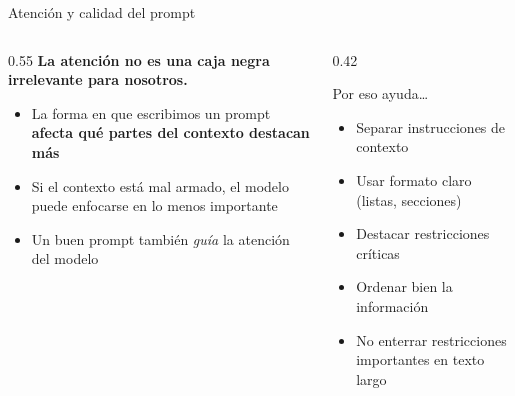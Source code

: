 \documentclass[aspectratio=169, 10pt]{beamer}
\newcommand{\concept}[1]{\textcolor{fenblue}{\textbf{#1}}}
\begin{document}
\begin{frame}{Atención y calidad del prompt}

  \begin{columns}[T]
    \begin{column}{0.55\textwidth}
      \textbf{La atención no es una caja negra irrelevante para nosotros.}
      \vspace{0.3em}
      \begin{itemize}
        \item La forma en que escribimos un prompt \concept{afecta qué partes del contexto destacan más}
        \item Si el contexto está mal armado, el modelo puede enfocarse en lo menos importante
        \item Un buen prompt también \textit{guía} la atención del modelo
      \end{itemize}
    \end{column}
    \begin{column}{0.42\textwidth}
      \begin{block}{Por eso ayuda\ldots}
        \begin{itemize}
          \item Separar instrucciones de contexto
          \item Usar formato claro (listas, secciones)
          \item Destacar restricciones críticas
          \item Ordenar bien la información
          \item No enterrar restricciones importantes en texto largo
        \end{itemize}
      \end{block}
    \end{column}
  \end{columns}

\end{frame}

\end{document}
